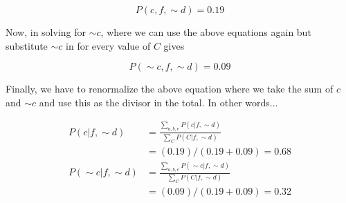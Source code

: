 \documentclass[12pt]{article}
\begin{document}
\begin{enumerate}
\[
  P(c,f,\sim d) = 0.19
\]

Now, in solving for $\sim c$, where we can use the above equations again but substitute $\sim c$ in for every value of $C$ gives

\[
  P(\sim c, f, \sim d) = 0.09
\]

Finally, we have to renormalize the above equation where we take the sum of $c$ and $\sim c$ and use this as the divisor in the total. In other words...

\begin{align*}
  P(c|f, \sim d) &= \frac{\sum_{a,b,e}P(c|f,\sim d)}{\sum_{C}P(C | f, \sim d)}\\
                 &= (0.19)/(0.19 + 0.09) = 0.68\\
  P(\sim c| f, \sim d) &= \frac{\sum_{a,b,e}P(\sim c|f,\sim d)}{\sum_{C}P(C | f, \sim d)}\\
                       &= (0.09)/(0.19+0.09) = 0.32
\end{align*}

\end{enumerate}
\end{document}

